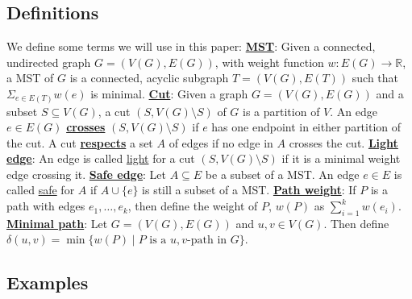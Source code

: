 \documentclass[11pt]{article}
\begin{document}
\subsection{Definitions}
We define some terms we will use in this paper:
\newline
\newline
\textbf{\underline{MST}}: Given a connected, undirected graph $G=(V(G),E(G))$,
with weight function $w:E(G)\rightarrow\mathbb{R}$, a MST of $G$ is a connected,
acyclic subgraph $T=(V(G),E(T))$ such that $\Sigma_{e\in E(T)}w(e)$ is minimal.
\newline
\newline
\textbf{\underline{Cut}}: Given a graph $G=(V(G),E(G))$ and a subset
$S\subseteq V(G)$, a cut $(S,V(G)\setminus S)$ of $G$ is a partition of $V$.
An edge $e\in E(G)$ \textbf{\underline{crosses}} $(S,V(G)\setminus S)$ if $e$
has one endpoint in either partition of the cut. A cut
\textbf{\underline{respects}} a set $A$ of edges if no edge in $A$ crosses the
cut.
\newline
\newline
\textbf{\underline{Light edge}}: An edge is called \underline{light} for a cut
$(S,V(G)\setminus S)$ if it is a minimal weight edge crossing it.
\newline
\newline
\textbf{\underline{Safe edge}}: Let $A\subseteq E$ be a subset of a MST. An
edge $e\in E$ is called \underline{safe} for $A$ if $A\cup\{e\}$ is still a
subset of a MST.
\newline
\newline
\textbf{\underline{Path weight}}: If $P$ is a path with edges $e_1,\ldots,e_k$,
then define the weight of $P$, $w(P)$ as $\sum_{i=1}^kw(e_i)$.
\newline
\newline
\textbf{\underline{Minimal path}}: Let $G=(V(G),E(G))$ and $u,v\in V(G)$. Then
define $\delta(u,v)=\min\{w(P)\mid\text{$P$ is a $u,v$-path in $G$}\}$.


\subsection{Examples}

\begin{figure}[H]

\end{figure}
\begin{figure}[H]

\end{figure}
\begin{figure}[H]

\end{figure}
\end{document}
